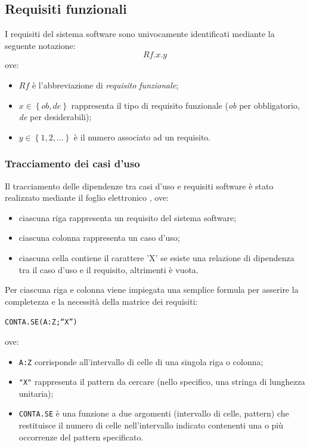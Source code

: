 \subsection{Requisiti funzionali} I requisiti del sistema software sono univocamente identificati mediante la seguente notazione:
$$Rf.x.y$$
ove:
\begin{itemize}
\item $Rf$ è l'abbreviazione di \textit{requisito funzionale};
\item $x \in \left\{ob,de\right\}$ rappresenta il tipo di requisito funzionale (\textit{ob} per obbligatorio, \textit{de} per desiderabili);
\item $y \in \left\{1,2,\ldots\right\}$ è il numero associato ad un requisito.
\end{itemize}

\subsubsection{Tracciamento dei casi d'uso}
Il tracciamento delle dipendenze tra casi d'uso e requisiti software è stato realizzato mediante il foglio elettronico , ove:
\begin{itemize}
\item ciascuna riga rappresenta un requisito del sistema software;
\item ciascuna colonna rappresenta un caso d'uso;
\item ciascuna cella contiene il carattere 'X' se esiste una relazione di dipendenza tra il caso d'uso e il requisito, altrimenti è vuota.
\end{itemize}

Per ciascuna riga e colonna viene impiegata una semplice formula per asserire la completezza e la necessità della matrice dei requisiti:  
\begin{center}
\texttt{CONTA.SE(A:Z;``X'')}   
\end{center}
ove:
\begin{itemize}
\item \texttt{A:Z} corrisponde all'intervallo di celle di una singola riga o colonna;
\item \texttt{"X"} rappresenta il pattern da cercare (nello specifico, una stringa di lunghezza unitaria);
\item \texttt{CONTA.SE} è una funzione a due argomenti (intervallo di celle, pattern) che restituisce il numero di celle nell'intervallo indicato contenenti una o più occorrenze del pattern specificato.
\end{itemize}

